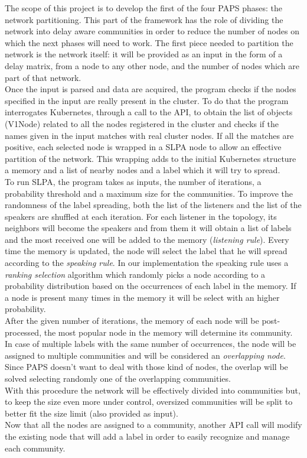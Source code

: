 The scope of this project is to develop the first of the four PAPS phases: the network 
partitioning. This part of the framework has the role of dividing the network into 
delay aware communities in order to reduce the number of nodes on which the next phases
will need to work. The first piece needed to partition the network is the network itself:
it will be provided as an input in the form of a delay matrix, from a node to any other
node, and the number of nodes which are part of that network. \\ 
Once the input is parsed and data are acquired, the program checks if the nodes specified 
in the input are really present in the cluster. To do that the program interrogates 
Kubernetes, through a call to the API, to obtain the list of objects (V1Node) related to
all the nodes registered in the cluster and checks if the names given in the
input matches with real cluster nodes. If all the matches are positive, each selected 
node is wrapped in a SLPA node to allow an effective partition of the network.
This wrapping adds to the initial Kubernetes structure a memory and a list of nearby 
nodes and a label which it will try to spread.\\
To run SLPA, the program takes as inputs, the number of iterations, a probability threshold 
and a maximum size for the communities. To improve the randomness of the label spreading, 
both the list of the listeners and the list of the speakers are shuffled at each iteration.
For each listener in the topology, its neighbors will become the speakers and from them it
will obtain a list of labels and the most received one will be added to the memory 
(\textit{listening rule}). Every time the memory is updated, the node will select the 
label that he will spread according to the \textit{speaking rule}. In our implementation
the speaking rule uses a \textit{ranking selection} algorithm which randomly picks a node
according to a probability distribution based on the occurrences of each label
in the memory. If a node is present many times in the memory it will be select with an 
higher probability. \\
After the given number of iterations, the memory of each node will be post-processed, 
the most popular node in the memory will determine its community. In case of multiple
labels with the same number of occurrences, the node will be assigned to multiple 
communities and will be considered an \textit{overlapping node}. Since PAPS doesn't 
want to deal with those kind of nodes, the overlap will be solved selecting randomly 
one of the overlapping communities. \\
With this procedure the network will be effectively divided into communities but, 
to keep the size even more under control, oversized communities will be split to better
fit the size limit (also provided as input). \\
Now that all the nodes are assigned to a community, another API call will modify the
existing node that will add a label in order to easily recognize and manage each community.
